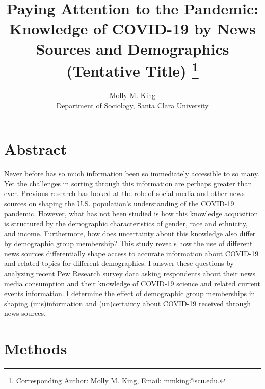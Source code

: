 \documentclass[11pt]{article}
\begin{document}
\title{Paying Attention to the Pandemic: Knowledge of COVID-19 by News Sources and Demographics (Tentative Title)
\footnote{Corresponding Author: Molly M. King,
          Email: mmking@scu.edu.}}

\author{Molly M. King \\ Department of Sociology, Santa Clara University}
\date{}

\clearpage\maketitle

\hypertarget{abstract}{%
\section{Abstract}\label{sec:abstract}}
\pagestyle{fancy} %
\setcounter{page}{1} %


Never before has so much information been so immediately accessible to
so many. Yet the challenges in sorting through this information are perhaps
greater than ever. Previous research has looked at the role of social media and
other news sources on shaping the U.S. population’s understanding of the COVID-19
pandemic. However, what has not been studied is how this knowledge acquisition
is structured by the demographic characteristics of gender, race and ethnicity, and
income. Furthermore, how does uncertainty about this knowledge also differ by
demographic group membership? This study reveals how the use of
different news sources differentially shape access to accurate information about
COVID-19 and related topics for different demographics. I answer these questions
by analyzing recent Pew Research survey data asking respondents about their news
media consumption and their knowledge of COVID-19 science and related current
events information. I determine the effect of demographic group memberships in
shaping (mis)information and (un)certainty about COVID-19 received through news sources.



\hypertarget{methods}{%
\section{Methods}\label{sec:methods}}
\end{document}
